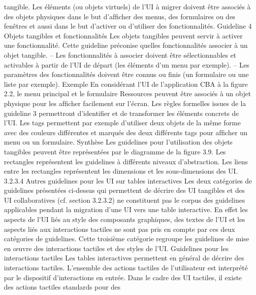 \documentclass{article}
\begin{document}
tangible. Les \'{e}l\'{e}ments (ou objets virtuels) de l’UI \`{a} migrer doivent \^{e}tre associ\'{e}s
\`{a} des objets physiques dans le but d’afﬁcher des menus, des formulaires ou des
fen\^{e}tres et aussi dans le but d’activer ou d’utiliser des fonctionnalit\'{e}s.
Guideline 4 Objets tangibles et fonctionnalit\'{e}s
Les objets tangibles peuvent servir \`{a} activer une fonctionnalit\'{e}. Cette guideline
pr\'{e}conise quelles fonctionnalit\'{e}s associer \`{a} un objet tangible.
– Les fonctionnalit\'{e}s \`{a} associer doivent \^{e}tre s\'{e}lectionnables et activables \`{a} partir
de l’UI de d\'{e}part (les \'{e}l\'{e}ments d’un menu par exemple).
– Les param\`{e}tres des fonctionnalit\'{e}s doivent \^{e}tre connus ou ﬁnis (un formulaire
ou une liste par exemple).
Exemple
En consid\'{e}rant l’UI de l’application CBA \`{a} la ﬁgure 2.2, le menu principal et le formulaire Ressources peuvent \^{e}tre associ\'{e}s \`{a} un objet physique pour les afﬁcher facilement sur l’\'{e}cran.
Les r\`{e}gles formelles issues de la guideline 3 permettront d’identiﬁer et de transformer les \'{e}l\'{e}ments
concrets de l’UI. Les tags permettent par exemple d’utiliser deux objets de la m\^{e}me forme avec des
couleurs diff\'{e}rentes et marqu\'{e}s des deux diff\'{e}rents tags pour afﬁcher un menu ou un formulaire.
Synth\`{e}se
Les guidelines pour l’utilisation des objets tangibles peuvent \^{e}tre repr\'{e}sent\'{e}es par le diagramme de la ﬁgure 3.9. Les rectangles repr\'{e}sentent les guidelines \`{a} diff\'{e}rents niveaux d’abstraction.
Les liens entre les rectangles repr\'{e}sentent les dimensions et les sous-dimensions des UI.
3.2.3.4
Autres guidelines pour les UI sur tables interactives
Les deux cat\'{e}gories de guidelines pr\'{e}sent\'{e}es ci-dessus qui permettent de d\'{e}crire des UI tangibles
et des UI collaboratives (cf. section 3.2.3.2) ne constituent pas le corpus des guidelines applicables
pendant la migration d’une UI vers une table interactive. En effet les aspects de l’UI li\'{e}s au style des
composants graphiques, des textes de l’UI et les aspects li\'{e}s aux interactions tactiles ne sont pas pris
en compte par ces deux cat\'{e}gories de guidelines. Cette troisi\`{e}me cat\'{e}gorie regroupe les guidelines de
mise en œuvre des interactions tactiles et des styles de l’UI.
Guidelines pour les interactions tactiles
Les tables interactives permettent en g\'{e}n\'{e}ral de d\'{e}crire
des interactions tactiles. L’ensemble des actions tactiles de l’utilisateur est interpr\'{e}t\'{e} par le dispositif
d’interactions en entr\'{e}e. Dans le cadre des UI tactiles, il existe des actions tactiles standards pour des
\end{document}
